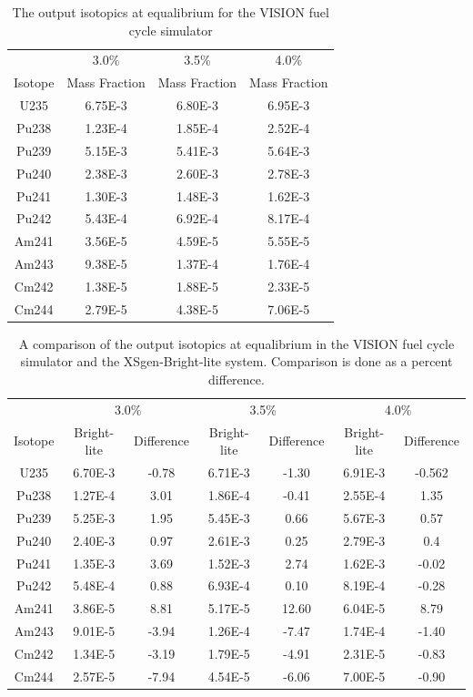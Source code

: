 \documentclass{article}
\begin{document}
\begin{table}[!htb]
\centering
\small
\caption{The output isotopics at equalibrium for the VISION fuel cycle simulator}
\label{tab:a}
\vspace{0.5em}
\begin{tabular}{cccc}
 & \multicolumn{1}{c}{3.0\%} & \multicolumn{1}{c}{3.5\%} & \multicolumn{1}{c}{4.0\%} \\
Isotope & Mass Fraction & Mass Fraction & Mass Fraction \\
\hline
U235  & 6.75E-3 & 6.80E-3 & 6.95E-3 \\
Pu238 & 1.23E-4 & 1.85E-4 & 2.52E-4 \\
Pu239 & 5.15E-3 & 5.41E-3 & 5.64E-3 \\
Pu240 & 2.38E-3 & 2.60E-3 & 2.78E-3 \\
Pu241 & 1.30E-3 & 1.48E-3 & 1.62E-3 \\
Pu242 & 5.43E-4 & 6.92E-4 & 8.17E-4 \\
Am241 & 3.56E-5 & 4.59E-5 & 5.55E-5 \\
Am243 & 9.38E-5 & 1.37E-4 & 1.76E-4 \\
Cm242 & 1.38E-5 & 1.88E-5 & 2.33E-5 \\
Cm244 & 2.79E-5 & 4.38E-5 & 7.06E-5 \\
\hline
\end{tabular}
\end{table}

\begin{table}[!htb]
\centering
\small
\caption{A comparison of the output isotopics at equalibrium in the VISION fuel cycle simulator and the XSgen-Bright-lite system. Comparison is done as a percent difference.}
\label{tab:xsgenresults}
\vspace{0.5em}
\begin{tabular}{c cc  cc  cc }
 & \multicolumn{2}{c}{3.0\%} & \multicolumn{2}{c}{3.5\%} & \multicolumn{2}{c}{4.0\%} \\
Isotope & Bright-lite & Difference & Bright-lite & Difference & Bright-lite & Difference  \\
\hline
U235 & 6.70E-3 & -0.78 & 6.71E-3 & -1.30 & 6.91E-3 & -0.562 \\
Pu238 & 1.27E-4 & 3.01 & 1.86E-4 & -0.41 & 2.55E-4 & 1.35 \\
Pu239 & 5.25E-3 & 1.95 & 5.45E-3 & 0.66 & 5.67E-3 & 0.57 \\
Pu240 & 2.40E-3 & 0.97 & 2.61E-3 & 0.25 & 2.79E-3 & 0.4 \\
Pu241 & 1.35E-3 & 3.69 & 1.52E-3 & 2.74 & 1.62E-3 & -0.02 \\
Pu242 & 5.48E-4 & 0.88 & 6.93E-4 & 0.10 & 8.19E-4 & -0.28 \\
Am241 & 3.86E-5 & 8.81 & 5.17E-5 & 12.60 & 6.04E-5 & 8.79 \\
Am243 & 9.01E-5 & -3.94 & 1.26E-4 & -7.47 & 1.74E-4 & -1.40 \\
Cm242 & 1.34E-5 & -3.19 & 1.79E-5 & -4.91 & 2.31E-5 & -0.83 \\
Cm244 & 2.57E-5 & -7.94 & 4.54E-5 & -6.06 & 7.00E-5 & -0.90 \\
\hline
\end{tabular}
\end{table}
\end{document}
